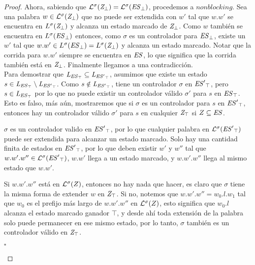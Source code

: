 \begin{proof}
Ahora, sabiendo que $\mathcal{L}^\sigma(\mathit{{Z}_{\bot}}) = 
\mathcal{L}^\sigma(\mathit{{\mathit{ES}}_{\bot}})$, procedemos a $nonblocking$. Sea una palabra $w \in 
\mathcal{L}^\sigma(\mathit{{Z}_{\bot}})$ que no puede ser extendida con $w'$ tal que $w.w'$ se encuentra en $L^\sigma(\mathit{{Z}_{\bot}})$ y alcanza un estado marcado de $\mathit{{Z}_{\bot}}$. 
Como $w$ también se encuentra en $L^\sigma(\mathit{{\mathit{ES}}_{\bot}})$ entonces, como $\sigma$ es un controlador para $\mathit{{\mathit{ES}}_{\bot}}$, existe un $w'$ tal que
$w.w' \in L^\sigma(\mathit{{\mathit{ES}}_{\bot}}) = L^\sigma(\mathit{{Z}_{\bot}})$ y alcanza un estado marcado. Notar que la corrida para $w.w'$ siempre se encuentra en $\mathit{ES}$, lo que significa que la corrida también está en $\mathit{{Z}_{\bot}}$. Finalmente llegamos a una contradicción.\\

Para demostrar que $\mathit{L_{\mathit{{\mathit{ES}}_{\top}}}} \subseteq \mathit{L_{\mathit{{\mathit{ES}'}_{\top}}}}$, asumimos que existe un estado $s \in \mathit{L_{\mathit{{\mathit{ES}}_{\top}}}} \setminus \mathit{L_{\mathit{{\mathit{ES}'}_{\top}}}}$. Como $s \notin \mathit{L_{\mathit{{\mathit{ES}'}_{\top}}}}$, tiene un controlador $\sigma$ en $\mathit{{\mathit{ES}'}_{\top}}$, pero $s \in \mathit{L_{\mathit{{\mathit{ES}}_{\top}}}}$ por lo que no puede existir un controlador válido $\sigma'$ para $s$ en $\mathit{{\mathit{ES}}_{\top}}$. Esto es falso, más aún, mostraremos que si $\sigma$ es un controlador para $s$ en $\mathit{{\mathit{ES}'}_{\top}}$, entonces hay un controlador válido $\sigma'$ para $s$ en cualquier $\mathit{{Z}_{\top}}$ si $Z \subseteq \mathit{ES}$.

$\sigma$ es un controlador valido en $\mathit{{\mathit{ES}'}_{\top}}$, por lo que cualquier palabra en $\mathcal{L}^\sigma(\mathit{{\mathit{ES}'}_{\top}})$ puede ser extendida para alcanzar un estado marcado. Solo hay una cantidad finita de estados en  $\mathit{{\mathit{ES}'}_{\top}}$, por lo que deben existir $w'$ y $w''$ tal que $w.w'.w'' \in \mathcal{L}^\sigma(\mathit{{\mathit{ES}'}_{\top}})$, $w.w'$ llega a un estado marcado, y $w.w'.w''$ llega al mismo estado que $w.w'$.

Si $w.w'.w''$ está en $\mathcal{L}^\sigma(Z)$, entonces no hay nada que hacer, es claro que $\sigma$ tiene la misma forma de extender $w$ en $\mathit{{Z}_{\top}}$. Si no, notemos que $w.w'.w'' = w_0.l.w_1$ tal que $w_0$ es el prefijo más largo de $w.w'.w''$ en $\mathcal{L}^\sigma(Z)$, esto significa que $w_0.l$ alcanza el estado marcado ganador $\top$, y desde ahí toda extensión de la palabra solo puede permanecer en ese mismo estado, por lo tanto, $\sigma$ también es un controlador válido en  $\mathit{{Z}_{\top}}$.
 
\begin{flushright}
$\square$
\end{flushright}

\end{proof}



